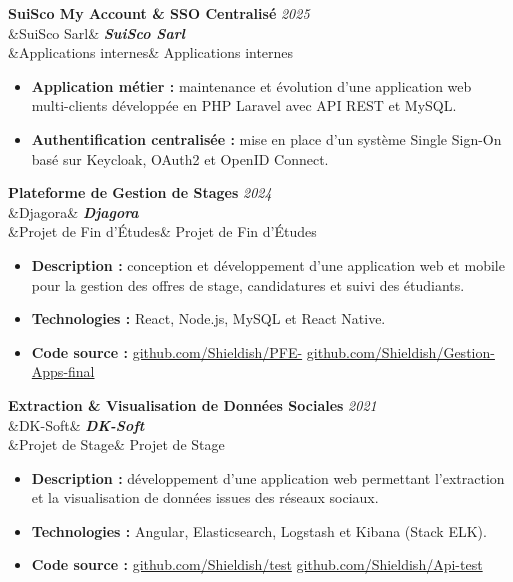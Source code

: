 \documentclass[11pt,a4paper]{article}
\newcommand{\cventry}[4]{%
    \needspace{3\baselineskip}%
    \noindent\textbf{\large #1}
    \hfill
    {\small\color{secondary}\textit{#2}}\\[2pt]%
    \ifx&#3&\else
        \noindent\textbf{\textit{#3}}\\[3pt]%
    \fi
    \ifx&#4&\else
        \noindent #4%
    \fi
    \vspace{6pt}\par
}
\begin{document}
\vspace{4pt}

\cventry
{SuiSco My Account \& SSO Centralisé}
{2025}
{SuiSco Sarl}
{Applications internes}

\begin{itemize}

    \item \textbf{Application métier :}
    maintenance et évolution d'une application web multi-clients
    développée en PHP Laravel avec API REST et MySQL.

    \item \textbf{Authentification centralisée :}
    mise en place d'un système Single Sign-On basé sur Keycloak,
    OAuth2 et OpenID Connect.

\end{itemize}

\vspace{4pt}

\cventry
{Plateforme de Gestion de Stages}
{2024}
{Djagora}
{Projet de Fin d'Études}

\begin{itemize}

    \item \textbf{Description :}
    conception et développement d'une application web et mobile
    pour la gestion des offres de stage, candidatures et suivi
    des étudiants.

    \item \textbf{Technologies :}
    React, Node.js, MySQL et React Native.

    \item \textbf{Code source :}
    \href{https://github.com/Shieldish/PFE-}
    {github.com/Shieldish/PFE-}
    \quad\textbullet\quad
    \href{https://github.com/Shieldish/Gestion-Apps-final}
    {github.com/Shieldish/Gestion-Apps-final}

\end{itemize}

\vspace{4pt}

\cventry
{Extraction \& Visualisation de Données Sociales}
{2021}
{DK-Soft}
{Projet de Stage}

\begin{itemize}

    \item \textbf{Description :}
    développement d'une application web permettant l'extraction
    et la visualisation de données issues des réseaux sociaux.

    \item \textbf{Technologies :}
    Angular, Elasticsearch, Logstash et Kibana (Stack ELK).

    \item \textbf{Code source :}
    \href{https://github.com/Shieldish/test}
    {github.com/Shieldish/test}
    \quad\textbullet\quad
    \href{https://github.com/Shieldish/Api-test}
    {github.com/Shieldish/Api-test}

\end{itemize}
\end{document}
